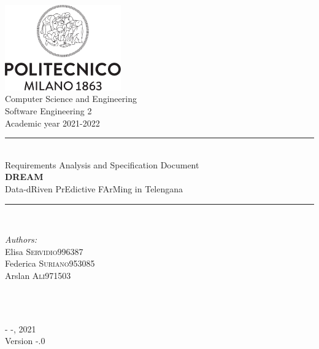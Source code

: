 \documentclass[a4paper,11pt]{report}
\begin{document}
\begin{titlepage}

\newcommand{\HRule}{\rule{\linewidth}{0.1mm}}

\center 

\includegraphics[width=50mm,scale=0.5]{Logo_Politecnico_Milano.png}\\[0.5cm] 

{\Large Computer Science and Engineering}\\[0.4cm] 
{\large Software Engineering 2}\\[0.4cm] 
{\large Academic year 2021-2022}\\[0.5cm] 

\HRule \\[1.5 cm]
{\LARGE Requirements Analysis and Specification Document} \\[1cm]
{\textbf {\Huge DREAM}}\\[0.3cm] 
{\LARGE Data-dRiven PrEdictive FArMing in Telengana} \\[1cm]
\HRule \\[1.5cm]
\raggedright

\begin{minipage}{0.55\textwidth}
\begin{flushleft} \large
\emph{Authors:}\\
Elisa \textsc{Servidio}\hfill 996387 \\
Federica \textsc{Suriano}\hfill 953085 \\
Arslan \textsc{Ali}\hfill 971503 \\
\end{flushleft}
\end{minipage}\\[1 cm]
~

\center

{\large - -, 2021}\\[0.3 cm]
{\large Version -.0}\\

\vfill 
\end{titlepage}

\newpage

\tableofcontents
{}
\listoftables
\newpage
\listoffigures
\newpage
\end{document}
